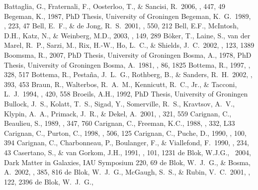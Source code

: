 \documentclass[usenatbib,usegraphicx,apjfonts,floatfix]{emulateapj}
\begin{document}
\begin{thebibliography}{}

 Battaglia, G., 
Fraternali, F., Oosterloo, T., \& Sancisi, R.\ 2006, \aap, 447, 49 
 Begeman, K., 1987, PhD Thesis, University of Groningen
 Begeman, K.~G.\ 1989, \aap, 
223, 47 
 Bell, E.~F., \& de 
Jong, R.~S.\ 2001, \apj, 550, 212 
 Bell, E.F., McIntosh, D.H., Katz, N., \& Weinberg, M.D., 2003, \apjs, 149, 289
 B{\"o}ker, T., Laine, 
S., van der Marel, R.~P., Sarzi, M., Rix, H.-W., Ho, L.~C., \& Shields, 
J.~C.\ 2002, \aj, 123, 1389 
 Boomsma, R., 2007, PhD Thesis, University of Groningen
 Bosma, A., 1978, PhD Thesis, University of Groningen
 Bosma, A.\ 1981, \aj, 86, 1825 
 Bottema, R., 1997, \aap, 328, 517
 Bottema, R., 
Pesta{\~n}a, J.~L.~G., Rothberg, B., \& Sanders, R.~H.\ 2002, \aap, 393, 
453 
 Braun, R., Walterbos, 
R.~A.~M., Kennicutt, R.~C., Jr., \& Tacconi, L.~J.\ 1994, \apj, 420, 558 
 Broeils, A.H., 1992, PhD Thesis, University of Groningen
 Bullock, J.~S., Kolatt, 
T.~S., Sigad, Y., Somerville, R.~S., Kravtsov, A.~V., Klypin, A.~A., 
Primack, J.~R., \& Dekel, A.\ 2001, \mnras, 321, 559 
 Carignan, C., Beaulieu, S., 1989, \apj, 347, 760
 Carignan, C., Freeman, K.C., 1988, \apjl, 332, L33
 Carignan, C., Purton, C., 1998, \apj, 506, 125
 Carignan, C., Puche, D., 1990, \aj, 100, 394
 Carignan, C., 
Charbonneau, P., Boulanger, F., \& Viallefond, F.\ 1990, \aap, 234, 43 
 Casertano, S., \& van Gorkom, J.H., 1991, \aj, 101, 1231
de Blok, W.J.G., \ 2004, Dark 
Matter in Galaxies, IAU Symposium 220, 69
 de Blok, W.~J.~G., \& 
Bosma, A.\ 2002, \aap, 385, 816 
 de Blok, W.~J.~G., 
McGaugh, S.~S., \& Rubin, V.~C.\ 2001, \aj, 122, 2396 
 de Blok, W.~J.~G., 

\end{thebibliography}
\end{document}
